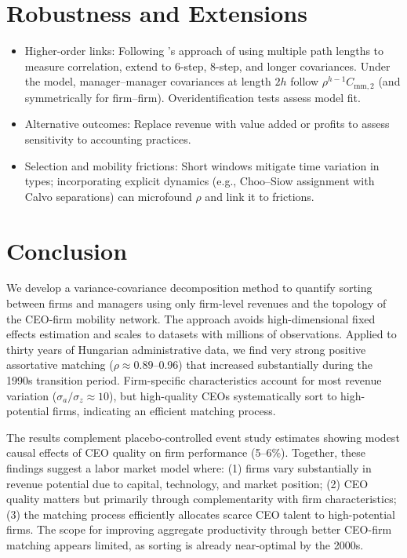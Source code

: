 \documentclass[11pt]{article}
\begin{document}
\section{Robustness and Extensions}
\begin{itemize}
  \item Higher-order links: Following \citet{Clark2023}'s approach of using multiple path lengths to measure correlation, extend to 6-step, 8-step, and longer covariances. Under the model, manager--manager covariances at length $2h$ follow $\rho^{h-1} C_{\text{mm},2}$ (and symmetrically for firm--firm). Overidentification tests assess model fit.
  \item Alternative outcomes: Replace revenue with value added or profits to assess sensitivity to accounting practices.
  \item Selection and mobility frictions: Short windows mitigate time variation in types; incorporating explicit dynamics (e.g., Choo--Siow assignment with Calvo separations) can microfound $\rho$ and link it to frictions.
\end{itemize}

\section{Conclusion}
We develop a variance-covariance decomposition method to quantify sorting between firms and managers using only firm-level revenues and the topology of the CEO-firm mobility network. The approach avoids high-dimensional fixed effects estimation and scales to datasets with millions of observations. Applied to thirty years of Hungarian administrative data, we find very strong positive assortative matching ($\rho \approx 0.89$--0.96) that increased substantially during the 1990s transition period. Firm-specific characteristics account for most revenue variation ($\sigma_a/\sigma_z \approx 10$), but high-quality CEOs systematically sort to high-potential firms, indicating an efficient matching process.

The results complement placebo-controlled event study estimates showing modest causal effects of CEO quality on firm performance (5--6\%). Together, these findings suggest a labor market model where: (1) firms vary substantially in revenue potential due to capital, technology, and market position; (2) CEO quality matters but primarily through complementarity with firm characteristics; (3) the matching process efficiently allocates scarce CEO talent to high-potential firms. The scope for improving aggregate productivity through better CEO-firm matching appears limited, as sorting is already near-optimal by the 2000s.
\end{document}
